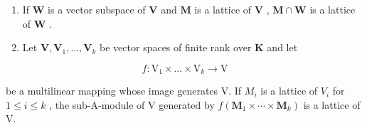 \begin{enumerate}
\def\labelenumi{(\roman{enumi})}
\setcounter{enumi}{1}
\item
  If \(\mathbf{W}\) is a vector subspace of \(\mathbf{V}\) and \(\mathbf{M}\) is a lattice of \(\mathbf{V}\) , \(\mathbf{M} \cap \mathbf{W}\) is a lattice of \(\mathbf{W}\) .
\item
  Let \(\mathbf{V},\mathbf{V}_1,\ldots ,\mathbf{V}_k\) be vector spaces of finite rank over \(\mathbf{K}\) and let
\end{enumerate}

\[
f \colon \mathrm{V} _ {1} \times \dots \times \mathrm{V} _ {k} \rightarrow \mathrm{V}
\]

be a multilinear mapping whose image generates V. If \(M_{i}\) is a lattice of \(V_{i}\) for \(1 \leqslant i \leqslant k\) , the sub-A-module of V generated by \(f(\mathbf{M}_{1} \times \cdots \times \mathbf{M}_{k})\) is a lattice of V.

